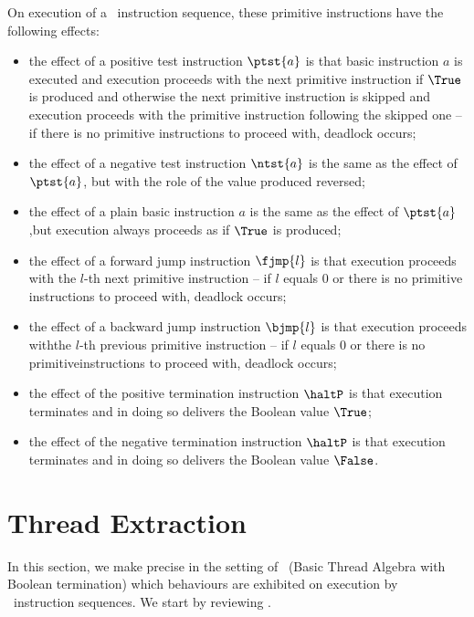 \documentclass[fleqn]{llncs}
\begin{document}
On execution of a \PGLBbt\ instruction sequence, these primitive
instructions have the following effects:
\begin{itemize}
\item
the effect of a positive test instruction $\ptst{a}$ is that basic
instruction $a$ is executed and execution proceeds with the next
primitive instruction if $\True$ is produced and otherwise the next
primitive instruction is skipped and execution proceeds with the
primitive instruction following the skipped one -- if there is no
primitive instructions to proceed with, deadlock occurs;
\item
the effect of a negative test instruction $\ntst{a}$ is the same as the
effect of $\ptst{a}$, but with the role of the value produced reversed;
\item
the effect of a plain basic instruction $a$ is the same as the effect of
$\ptst{a}$,\linebreak[2] but execution always proceeds as if $\True$ is
produced;
\item
the effect of a forward jump instruction $\fjmp{l}$ is that execution
proceeds with the $l$-th next primitive instruction -- if $l$ equals $0$
or there is no primitive instructions to proceed with, deadlock occurs;
\item
the effect of a backward jump instruction $\bjmp{l}$ is that execution
proceeds with\linebreak[2] the $l$-th previous primitive instruction --
if $l$ equals $0$ or there is no primitive\linebreak[2] instructions to
proceed with, deadlock occurs;
\item
the effect of the positive termination instruction $\haltP$ is that
execution terminates and in doing so delivers the Boolean value $\True$;
\item
the effect of the negative termination instruction $\haltP$ is that
execution terminates and in doing so delivers the Boolean value
$\False$.
\end{itemize}

\section{Thread Extraction}
\label{sect-BTAbt}

In this section, we make precise in the setting of \BTAbt\ (Basic Thread
Algebra with Boolean termination) which behaviours are exhibited on
execution by \PGLBbt\ instruction sequences.
We start by reviewing \BTAbt.
\end{document}
